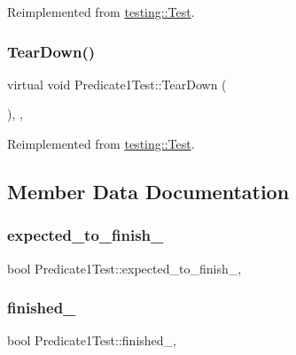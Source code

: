 Reimplemented from \mbox{\hyperlink{classtesting_1_1_test_a5f0ab439802cbe0ef7552f1a9f791923}{testing\+::\+Test}}.

\mbox{\label{class_predicate1_test_ad2974af5c6abc508847c3a9912b24a90}} 
\subsubsection{\texorpdfstring{TearDown()}{TearDown()}\hspace{0.1cm}{\footnotesize\ttfamily [3/3]}}
{\footnotesize\ttfamily virtual void Predicate1\+Test\+::\+Tear\+Down (\begin{DoxyParamCaption}{ }\end{DoxyParamCaption})\hspace{0.3cm}{\ttfamily [inline]}, {\ttfamily [protected]}, {\ttfamily [virtual]}}



Reimplemented from \mbox{\hyperlink{classtesting_1_1_test_a5f0ab439802cbe0ef7552f1a9f791923}{testing\+::\+Test}}.



\subsection{Member Data Documentation}
\mbox{\label{class_predicate1_test_ad91cfa58e6352d53abacce32df2ef635}} 
\subsubsection{\texorpdfstring{expected\_to\_finish\_}{expected\_to\_finish\_}}
{\footnotesize\ttfamily bool Predicate1\+Test\+::expected\+\_\+to\+\_\+finish\+\_\+\hspace{0.3cm}{\ttfamily [static]}, {\ttfamily [protected]}}

\mbox{\label{class_predicate1_test_a6d45fb2d1f01a5c8baf28f60039c244e}} 
\subsubsection{\texorpdfstring{finished\_}{finished\_}}
{\footnotesize\ttfamily bool Predicate1\+Test\+::finished\+\_\+\hspace{0.3cm}{\ttfamily [static]}, {\ttfamily [protected]}}

